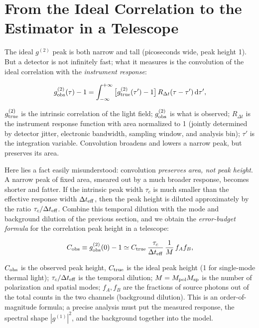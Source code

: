 \section{From the Ideal Correlation to the Estimator in a Telescope}
\label{sec:e08-telescope}

The ideal \(g^{(2)}\) peak is both narrow and tall (picoseconds wide, peak height 1). But a detector is not infinitely fast; what it measures is the convolution of the ideal correlation with the \emph{instrument response}:

\begin{equation}
  g_{\rm obs}^{(2)}(\tau)-1=\int_{-\infty}^{+\infty}
  \big[g_{\rm true}^{(2)}(\tau')-1\big]\,R_{\Delta t}(\tau-\tau')\,{\rm d}\tau',
  \label{eq:e08-response-conv}
\end{equation}
\begin{formulaexplain}
\(g_{\rm true}^{(2)}\) is the intrinsic correlation of the light field; \(g_{\rm obs}^{(2)}\) is what is observed; \(R_{\Delta t}\) is the instrument response function with area normalized to 1 (jointly determined by detector jitter, electronic bandwidth, sampling window, and analysis bin); \(\tau'\) is the integration variable. Convolution broadens and lowers a narrow peak, but preserves its area.
\end{formulaexplain}

Here lies a fact easily misunderstood: convolution \emph{preserves area, not peak height}. A narrow peak of fixed area, smeared out by a much broader response, becomes shorter and fatter. If the intrinsic peak width \(\tau_c\) is much smaller than the effective response width \(\Delta t_{\rm eff}\), then the peak height is diluted approximately by the ratio \(\tau_c/\Delta t_{\rm eff}\). Combine this temporal dilution with the mode and background dilution of the previous section, and we obtain the \emph{error-budget formula} for the correlation peak height in a telescope:

\begin{equation}
  C_{\rm obs}\equiv g_{\rm obs}^{(2)}(0)-1
  \simeq C_{\rm true}\,\frac{\tau_c}{\Delta t_{\rm eff}}\,\frac{1}{M}\,f_A f_B,
  \label{eq:e08-contrast}
\end{equation}
\begin{formulaexplain}
\(C_{\rm obs}\) is the observed peak height, \(C_{\rm true}\) is the ideal peak height (1 for single-mode thermal light); \(\tau_c/\Delta t_{\rm eff}\) is the temporal dilution; \(M=M_{\rm pol}M_{\rm sp}\) is the number of polarization and spatial modes; \(f_A,f_B\) are the fractions of source photons out of the total counts in the two channels (background dilution). This is an order-of-magnitude formula; a precise analysis must put the measured response, the spectral shape \(|g^{(1)}|^2\), and the background together into the model.
\end{formulaexplain}

